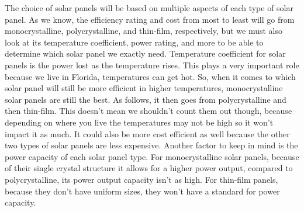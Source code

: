 The choice of solar panels will be based on multiple aspects of each type of solar panel. As we know, the efficiency rating and cost from most to least will go from monocrystalline, polycrystalline, and thin-film, respectively, but we must also look at its temperature coefficient, power rating, and more to be able to determine which solar panel we exactly need. Temperature coefficient for solar panels is the power lost as the temperature rises. This plays a very important role because we live in Florida, temperatures can get hot. So, when it comes to which solar panel will still be more efficient in higher temperatures, monocrystalline solar panels are still the best. As follows, it then goes from polycrystalline and then thin-film. This doesn’t mean we shouldn’t count them out though, because depending on where you live the temperatures may not be high so it won’t impact it as much. It could also be more cost efficient as well because the other two types of solar panels are less expensive. Another factor to keep in mind is the power capacity of each solar panel type. For monocrystalline solar panels, because of their single crystal structure it allows for a higher power output, compared to polycrystalline, its power output capacity isn’t as high. For thin-film panels, because they don’t have uniform sizes, they won’t have a standard for power capacity.\par

